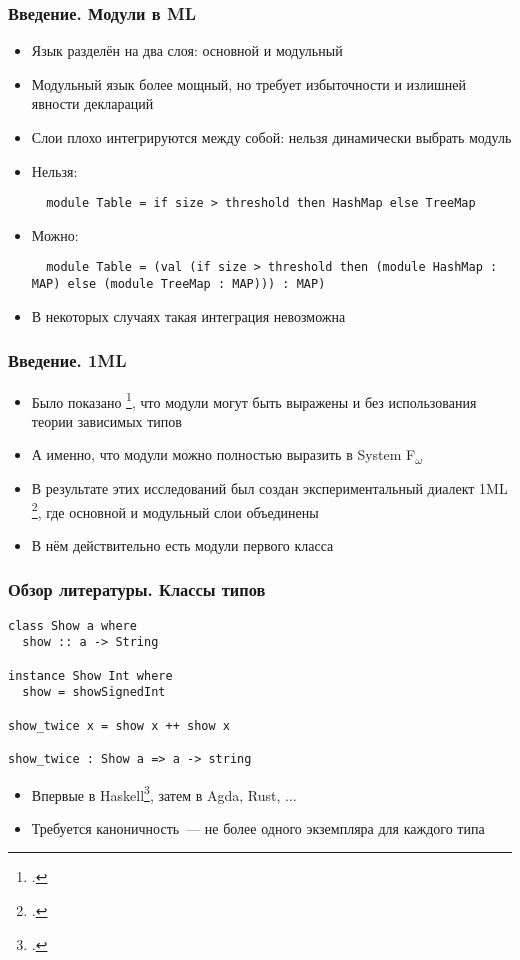 \documentclass{beamer}
\begin{document}
\lstset{language=caml}
\begin{frame}[fragile]\frametitle{Введение. Модули в ML}
\begin{itemize}
  \item Язык разделён на два слоя: основной и модульный
  \item Модульный язык более мощный, но требует избыточности и излишней явности деклараций
  \item Слои плохо интегрируются между собой: нельзя динамически выбрать модуль
  \item Нельзя: \begin{lstlisting}
  module Table = if size > threshold then HashMap else TreeMap
  \end{lstlisting}
  \item Можно: \begin{lstlisting}
  module Table = (val (if size > threshold then (module HashMap : MAP) else (module TreeMap : MAP))) : MAP)
  \end{lstlisting}
  \item В некоторых случаях такая интеграция невозможна
\end{itemize}
\end{frame}

\begin{frame}\frametitle{Введение. 1ML}
\begin{itemize}
  \item Было показано \footcite{fing}, что модули могут быть выражены и без использования теории зависимых типов
  \item А именно, что модули можно полностью выразить в System F\textsubscript{$\omega$}
  \item В результате этих исследований был создан экспериментальный диалект 1ML \footcite{1ml}, где основной и модульный слои объединены
  \item В нём действительно есть модули первого класса
\end{itemize}
\end{frame}

\lstset{language=haskell}
\begin{frame}[fragile]\frametitle{Обзор литературы. Классы типов}
\begin{lstlisting}
class Show a where
  show :: a -> String

instance Show Int where
  show = showSignedInt

show_twice x = show x ++ show x

show_twice : Show a => a -> string
\end{lstlisting}
\begin{itemize}
  \item Впервые в Haskell\footcite{adhoc}, затем в Agda, Rust, ...
  \item Требуется каноничность~--- не более одного экземпляра для каждого типа
\end{itemize}
\end{frame}
\end{document}
